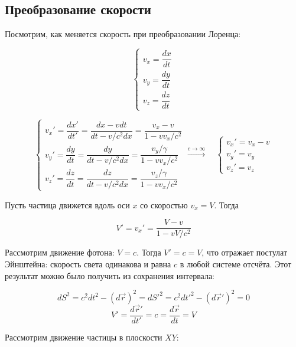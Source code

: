 \documentclass{article}
\begin{document}
\subsection{Преобразование скорости}

Посмотрим, как меняется скорость при преобразовании Лоренца:

\begin{equation*}
    \begin{cases}
    v_x=\dfrac{dx}{dt}\\
    v_y=\dfrac{dy}{dt}\\
    v_z=\dfrac{dz}{dt}
    \end{cases}
\end{equation*}

\begin{equation}\label{eq:lorentz_vel}
    \begin{cases}
    v_x'=\dfrac{dx'}{dt'}=\dfrac{dx-vdt}{dt-v/c^2dx}=\dfrac{v_x-v}{1-vv_x/c^2}\\
    v_y'=\dfrac{dy}{dt}=\dfrac{dy}{dt-v/c^2dx}=\dfrac{v_y/\gamma}{1-vv_x/c^2}\\
    v_z'=\dfrac{dz}{dt}=\dfrac{dz}{dt-v/c^2dx}=\dfrac{v_z/\gamma}{1-vv_x/c^2}
    \end{cases}
    \xrightarrow{c\to\infty}\quad
    \begin{cases}
    v_x'=v_x-v\\
    v_y'=v_y\\
    v_z'=v_z
    \end{cases}
\end{equation}

Пусть частица движется вдоль оси $x$ со скоростью $v_x=V$. Тогда

\begin{equation*}
    V'=v_x'=\dfrac{V-v}{1-vV/c^2}
\end{equation*}

Рассмотрим движение фотона: $V=c$. Тогда $V'=c=V$, что отражает постулат Эйнштейна: скорость света одинакова и равна $c$ в любой системе отсчёта. Этот результат можно было получить из сохранения интервала:

\begin{equation*}
    dS^2=c^2dt^2-\left(d\vec{r}\right)^2=dS'^2=c^2dt'^2-\left(d\vec{r}'\right)^2=0
\end{equation*}
\begin{equation*}
    V'=\frac{d\vec{r}'}{dt'}=c=\frac{d\vec{r}}{dt}=V
\end{equation*}

Рассмотрим движение частицы в плоскости $XY$:
\end{document}
